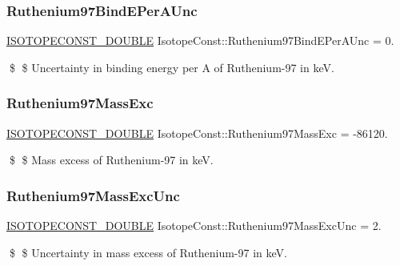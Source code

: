 \subsubsection{\texorpdfstring{Ruthenium97\+Bind\+E\+Per\+A\+Unc}{Ruthenium97BindEPerAUnc}}
{\footnotesize\ttfamily \mbox{\hyperlink{group___isotope_const-_macros_ga8f45a7272ce02c0b4c65c44636ed719a}{I\+S\+O\+T\+O\+P\+E\+C\+O\+N\+S\+T\+\_\+\+D\+O\+U\+B\+LE}} Isotope\+Const\+::\+Ruthenium97\+Bind\+E\+Per\+A\+Unc = 0.}

\$ \$ Uncertainty in binding energy per A of Ruthenium-\/97 in keV. \mbox{\label{group___isotope_const-_ruthenium-_ru97_ga9ce2fe0edf787d1e23e343de329cdbac}} 
\subsubsection{\texorpdfstring{Ruthenium97\+Mass\+Exc}{Ruthenium97MassExc}}
{\footnotesize\ttfamily \mbox{\hyperlink{group___isotope_const-_macros_ga8f45a7272ce02c0b4c65c44636ed719a}{I\+S\+O\+T\+O\+P\+E\+C\+O\+N\+S\+T\+\_\+\+D\+O\+U\+B\+LE}} Isotope\+Const\+::\+Ruthenium97\+Mass\+Exc = -\/86120.}

\$ \$ Mass excess of Ruthenium-\/97 in keV. \mbox{\label{group___isotope_const-_ruthenium-_ru97_gac3a6810c4ce49b0c40ad4a3a93a735e5}} 
\subsubsection{\texorpdfstring{Ruthenium97\+Mass\+Exc\+Unc}{Ruthenium97MassExcUnc}}
{\footnotesize\ttfamily \mbox{\hyperlink{group___isotope_const-_macros_ga8f45a7272ce02c0b4c65c44636ed719a}{I\+S\+O\+T\+O\+P\+E\+C\+O\+N\+S\+T\+\_\+\+D\+O\+U\+B\+LE}} Isotope\+Const\+::\+Ruthenium97\+Mass\+Exc\+Unc = 2.}

\$ \$ Uncertainty in mass excess of Ruthenium-\/97 in keV. \mbox{\label{group___isotope_const-_ruthenium-_ru97_gacc95b6599f6ca56bff7f4cbfee9d2d5e}} 
